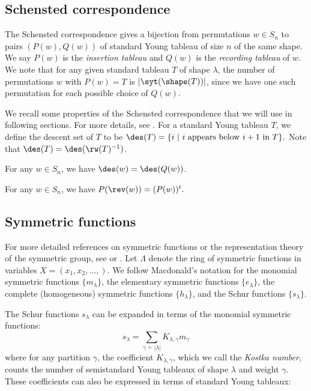 \subsection{Schensted correspondence}\label{subsec:RSK}
The Schensted correspondence gives a bijection from permutations $w\in S_n$ to pairs $(P(w),Q(w))$ of standard Young tableau of size $n$ of the same shape. We say $P(w)$ is the \textit{insertion tableau} and $Q(w)$ is the \textit{recording tableau} of $w$.
We note that for any given standard tableau $T$ of shape $\lambda$, the number of permutations $w$ with $P(w) = T$ is $|\syt(\shape(T))|$, since we have one such permutation for each possible choice of $Q(w)$.

We recall some properties of the Schensted correspondence that we will use in following sections. For more details, see \cite[Chapter 7]{EC2}. 
For a standard Young tableau $T$, we define the descent set of $T$ to be  $\des(T) = \{i  \ | \ i \text{ appears below } i+1 \text{ in } T\}.$
Note that $\des(T) = \des(\rw(T)^{-1})$.
\begin{prop}[{\cite[Lemma 7.23.11]{EC2}}]
    For any $w\in S_n$, we have $\des(w) = \des(Q(w))$. 
\end{prop}

\begin{prop}[{\cite[Corollary A1.2.11]{EC2}}]\label{thm:RSK rev}
For any $w\in S_n$, we have $P(\rev(w))= (P(w))^t.$
\end{prop}

\subsection{Symmetric functions}\label{subsec: symm functions}
For more detailed references on symmetric functions or the representation theory of the symmetric group, see \cite[Chapter 7]{EC2} or \cite{macdonald}.
Let $\Lambda$ denote the ring of symmetric functions in variables $X = (x_1,x_2,\dots, )$.
We follow Macdonald's notation \cite{macdonald} for the monomial symmetric functions $\{m_\lambda\}$, the elementary symmetric functions $\{e_\lambda\}$, the complete (homogeneous) symmetric functions $\{h_\lambda\}$, and the Schur functions $\{s_\lambda\}$.

The Schur functions $s_\lambda$ can be expanded in terms of the monomial symmetric functions:
\[s_\lambda  = \sum\limits_{\gamma \ \vdash |\lambda|} K_{\lambda,\gamma} m_{\gamma}\]
where for any partition $\gamma$, the coefficient $K_{\lambda,\gamma}$, which we call the \textit{Kostka number}, counts the number of semistandard Young tableaux of shape $\lambda$ and weight $\gamma$.
 These coefficients can also be expressed in terms of standard Young tableaux:

